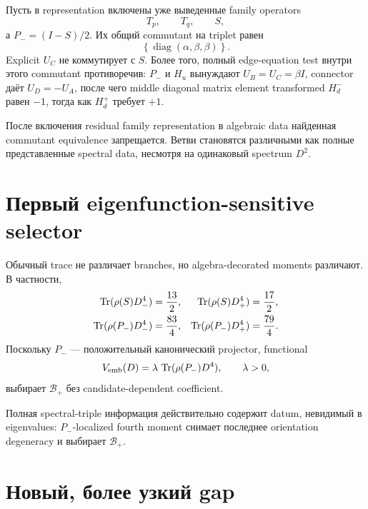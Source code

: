 Пусть в representation включены уже выведенные family operators
\begin{equation}
 T_p,\qquad T_q,\qquad S,
\end{equation}
а \(P_-=(I-S)/2\). Их общий commutant на triplet равен
\begin{equation}
 \left\{
 \operatorname{diag}(\alpha,\beta,\beta)
 \right\}.
\end{equation}
Explicit \(U_C\) не коммутирует с \(S\). Более того, полный edge-equation
test внутри этого commutant противоречив: \(P_-\) и \(H_u\) вынуждают
\(U_B=U_C=\beta I\), connector даёт \(U_D=-U_A\), после чего middle diagonal
matrix element transformed \(H_d^-\) равен \(-1\), тогда как \(H_d^+\)
требует \(+1\).

\begin{proposition}
После включения residual family representation в algebraic data найденная
commutant equivalence запрещается. Ветви становятся различными как полные
представленные spectral data, несмотря на одинаковый spectrum \(D^2\).
\end{proposition}

\section{Первый eigenfunction-sensitive selector}

Обычный trace не различает branches, но algebra-decorated moments различают.
В частности,
\begin{align}
 \operatorname{Tr}(\rho(S)D_-^4)&=\frac{13}{2},
 &
 \operatorname{Tr}(\rho(S)D_+^4)&=\frac{17}{2},\\
 \operatorname{Tr}(\rho(P_-)D_-^4)&=\frac{83}{4},
 &
 \operatorname{Tr}(\rho(P_-)D_+^4)&=\frac{79}{4}.
\end{align}
Поскольку \(P_-\) --- положительный канонический projector, functional
\begin{equation}
 V_{\rm emb}(D)=
 \lambda\,\operatorname{Tr}(\rho(P_-)D^4),
 \qquad \lambda>0,
\end{equation}
выбирает \(\mathcal B_+\) без candidate-dependent coefficient.

\begin{theorem}
Полная spectral-triple информация действительно содержит datum, невидимый
в eigenvalues: \(P_-\)-localized fourth moment снимает последнее
orientation degeneracy и выбирает \(\mathcal B_+\).
\end{theorem}

\section{Новый, более узкий gap}

